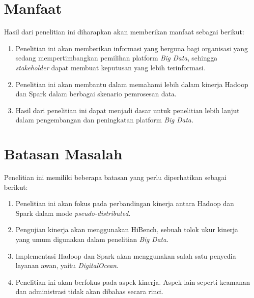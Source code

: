 \section{Manfaat}
Hasil dari penelitian ini diharapkan akan memberikan manfaat sebagai berikut:
\begin{enumerate}
	\item 
	Penelitian ini akan memberikan informasi yang berguna bagi organisasi yang sedang mempertimbangkan pemilihan platform \textit{Big Data}, sehingga \textit{stakeholder} dapat membuat keputusan yang lebih terinformasi.	
	\item
	Penelitian ini akan membantu dalam memahami lebih dalam kinerja Hadoop dan Spark dalam berbagai skenario pemrosesan data.
	\item
	Hasil dari penelitian ini dapat menjadi dasar untuk penelitian lebih lanjut dalam pengembangan dan peningkatan platform \textit{Big Data.}
\end{enumerate}

\section{Batasan Masalah}
Penelitian ini memiliki beberapa batasan yang perlu diperhatikan sebagai berikut:
	\begin{enumerate}
		\item 
		Penelitian ini akan fokus pada perbandingan kinerja antara Hadoop dan Spark dalam mode \textit{pseudo-distributed.}
		\item
		Pengujian kinerja akan menggunakan HiBench, sebuah tolok ukur kinerja yang umum digunakan dalam penelitian \textit{Big Data.}
		\item
		Implementasi Hadoop dan Spark akan menggunakan salah satu penyedia layanan awan, yaitu \textit{DigitalOcean}.
		\item
		Penelitian ini akan berfokus pada aspek kinerja. Aspek lain seperti keamanan dan administrasi tidak akan dibahas secara rinci.
	\end{enumerate}

%
%
%
